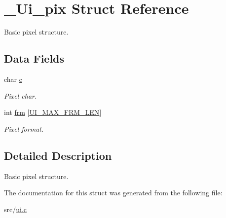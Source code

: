 \hypertarget{struct__Ui__pix}{}\section{\+\_\+\+Ui\+\_\+pix Struct Reference}
\label{struct__Ui__pix}


Basic pixel structure.  


\subsection*{Data Fields}
\begin{DoxyCompactItemize}
\item 
\mbox{\label{struct__Ui__pix_aa12b962b28524e2f295d0fd90b9595a8}} 
char \hyperlink{struct__Ui__pix_aa12b962b28524e2f295d0fd90b9595a8}{c}
\begin{DoxyCompactList}\small\item\em Pixel char. \end{DoxyCompactList}\item 
\mbox{\label{struct__Ui__pix_a55cb1d3cf8c169b53c55a6942b3cdd27}} 
int \hyperlink{struct__Ui__pix_a55cb1d3cf8c169b53c55a6942b3cdd27}{frm} \mbox{[}\hyperlink{ui_8c_aab208380ff579bef5fd8b91fa0c0215a}{U\+I\+\_\+\+M\+A\+X\+\_\+\+F\+R\+M\+\_\+\+L\+EN}\mbox{]}
\begin{DoxyCompactList}\small\item\em Pixel format. \end{DoxyCompactList}\end{DoxyCompactItemize}


\subsection{Detailed Description}
Basic pixel structure. 

The documentation for this struct was generated from the following file\+:\begin{DoxyCompactItemize}
\item 
src/\hyperlink{ui_8c}{ui.\+c}\end{DoxyCompactItemize}
